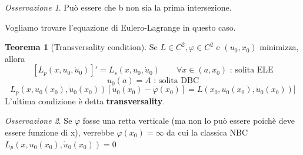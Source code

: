 \documentclass[a4paper]{book}
\theoremstyle{definition}
\theoremstyle{remark}
\newtheorem{oss}{Osservazione}
\theoremstyle{definition}
\newtheorem{teo}{Teorema}
\begin{document}
\begin{oss}
Può essere che b non sia la prima intersezione.
\end{oss}

Vogliamo trovare l'equazione di Eulero-Lagrange in questo caso.

\begin{teo}[Transversality condition]
Se $L \in C^2, \varphi \in C^2$ e $(u_0, x_0) $ minimizza, allora
\[
	[L_p(x, u_0, \dot{u}_0)]'=L_s(x, u_0, \dot{u}_0)\qquad\forall x \in (a, x_0)\text{ : solita ELE}
\]
\[
	u_0(a) = A \text{ : solita DBC}
\]
\[
	L_p(x, u_0(x_0), \dot{u}_0(x_0))[\dot{u}_0(x_0) - \dot{\varphi}(x_0)] = L(x_0, u_0(x_0), \dot{u}_0(x_0))]
\]
L'ultima condizione è detta \textbf{transversality}.
\end{teo}

\begin{oss}
Se $\varphi$ fosse una retta verticale (ma non lo può essere poichè deve essere funzione di x), verrebbe $\dot{\varphi}(x_0) = \infty$ da cui la classica NBC $L_p(x, u_0(x_0), \dot{u}_0(x_0))=0$
\end{oss}
\end{document}
